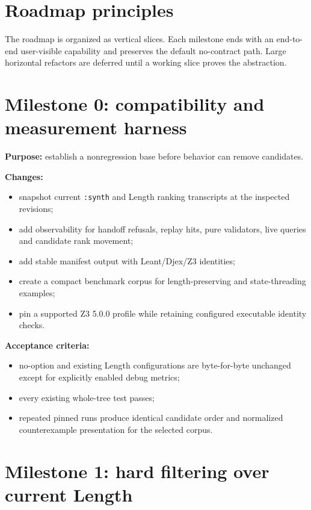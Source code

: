 \documentclass[11pt,oneside]{report}
\newcommand{\code}[1]{\texttt{#1}}
\begin{document}
\section{Roadmap principles}

The roadmap is organized as vertical slices. Each milestone ends with an end-to-end user-visible capability and preserves the default no-contract path. Large horizontal refactors are deferred until a working slice proves the abstraction.

\section{Milestone 0: compatibility and measurement harness}

\textbf{Purpose:} establish a nonregression base before behavior can remove candidates.

\textbf{Changes:}

\begin{itemize}[leftmargin=2em]
\item snapshot current \code{:synth} and Length ranking transcripts at the inspected revisions;
\item add observability for handoff refusals, replay hits, pure validators, live queries and candidate rank movement;
\item add stable manifest output with Leant/Djex/Z3 identities;
\item create a compact benchmark corpus for length-preserving and state-threading examples;
\item pin a supported Z3 5.0.0 profile while retaining configured executable identity checks.
\end{itemize}

\textbf{Acceptance criteria:}

\begin{itemize}[leftmargin=2em]
\item no-option and existing Length configurations are byte-for-byte unchanged except for explicitly enabled debug metrics;
\item every existing whole-tree test passes;
\item repeated pinned runs produce identical candidate order and normalized counterexample presentation for the selected corpus.
\end{itemize}

\section{Milestone 1: hard filtering over current Length}
\end{document}
